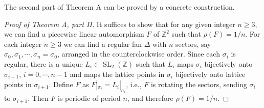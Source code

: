\documentclass[11pt]{amsart}
\theoremstyle{definition}
\theoremstyle{plain}
\theoremstyle{remark}
\numberwithin{equation}{section}
\DeclareMathOperator{\SL}{SL}
\def\Z{\mathbb{Z}}
\def\fan{\Delta}
\begin{document}
The second part of Theorem A can be proved by a concrete construction.

\begin{proof}[Proof of Theorem A, part II]
It suffices to show that for any given integer $n\ge 3$, we can find a piecewise
linear automorphism $F$ of $\Z^2$ such that $\rho(F)=1/n$.
For each integer $n\ge 3$ we can find a regular fan $\fan$ with $n$ sectors,
say $\sigma_0,\sigma_1,\cdots,\sigma_n=\sigma_0$, arranged in the counterclockwise order.
Since each $\sigma_i$ is regular, there is a unique $L_i\in \SL_2(\Z)$ such that $L_i$
maps $\sigma_i$ bijectively onto $\sigma_{i+1}$, $i=0,\cdots,n-1$ and maps the lattice
points in $\sigma_i$ bijectively onto lattice points in $\sigma_{i+1}$.
Define $F$ as $F|_{\sigma_i}=L_i|_{\sigma_i}$, i.e., $F$ is rotating the sectors,
sending $\sigma_i$ to $\sigma_{i+1}$. Then $F$ is periodic of period $n$, and therefore
$\rho(F)=1/n$.
\end{proof}




\end{document}
